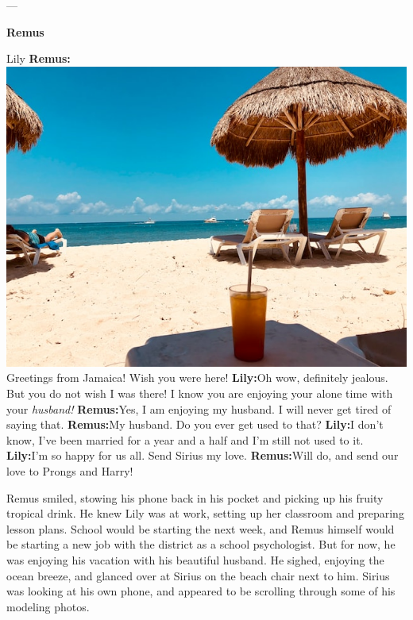 \documentclass[12pt,twoside,openright]{memoir}
\begin{document}
---

\textbf{Remus} 

Lily\newline
\textbf{Remus:} {\centering\includegraphics[width=\textwidth]{the-travel-nook-2FoqQ0EPwLg-unsplash}}
  Greetings from Jamaica! Wish you were here!\newline
\textbf{Lily:}Oh wow, definitely jealous. But you do not wish I was there! I know you are enjoying your alone time with your \textit{husband!} \newline
\textbf{Remus:}Yes, I am enjoying my husband. I will never get tired of saying that.\newline
\textbf{Remus:}My husband. Do you ever get used to that? \newline
\textbf{Lily:}I don't know, I've been married for a year and a half and I'm still not used to it.\newline
\textbf{Lily:}I'm so happy for us all.  Send Sirius my love.\newline
\textbf{Remus:}Will do, and send our love to Prongs and Harry!

Remus smiled, stowing his phone back in his pocket and picking up his fruity tropical drink. He knew Lily was at work, setting up her classroom and preparing lesson plans. School would be starting the next week, and Remus himself would be starting a new job with the district as a school psychologist. But for now, he was enjoying his vacation with his beautiful husband. He sighed, enjoying the ocean breeze, and glanced over at Sirius on the beach chair next to him. Sirius was looking at his own phone, and appeared to be scrolling through some of his modeling photos.
\end{document}
